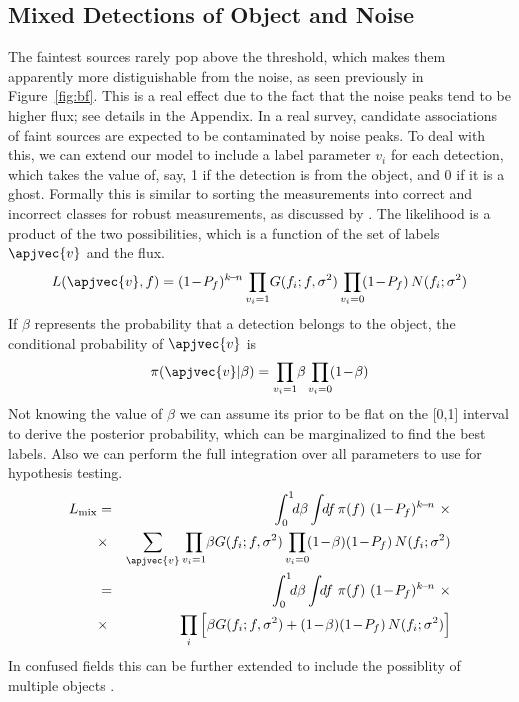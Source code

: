 \iffalse
\subsection{Mixed Detections of Object and Noise}
\label{sec:mix}
\noindent
The faintest sources rarely pop above the threshold, which makes them apparently more distiguishable from the noise, as seen previously in Figure~\ref{fig:bf}. This is a real effect due to the fact that the noise peaks tend to be higher flux; see details in the Appendix. In a real survey, candidate associations of faint sources are expected to be contaminated  by noise peaks. To deal with this, we can  extend our model to include a label parameter $v_i$ for each detection, which takes the value of, say, 1 if the detection is from the object, and 0 if it is a ghost.
%
Formally this is similar to sorting the measurements into correct and incorrect classes for robust measurements, as discussed by \citet{press}.
%
The likelihood is a product of the two possibilities, which is a function of the set of labels $\apjvec{v}$ and the flux.
%
\begin{equation}
L(\apjvec{v},f)= (1\!-\!P_f)^{k\!-\!n} \prod_{v_i=1}\!G(f_i;f,\sigma^2) \prod_{v_i=0}\!(1\!-\!P_f)\,N(f_i;\sigma^2)
\end{equation}
%
If $\beta$ represents the probability that a detection belongs to the object, the conditional probability of $\apjvec{v}$ is
%
\begin{equation}
\pi(\apjvec{v}|\beta) = \prod_{v_i=1}\!\beta \prod_{v_i=0}\!(1\!-\!\beta)
\end{equation}
%
Not knowing the value of $\beta$ we can assume its prior to be flat on the [0,1] interval to derive the posterior probability, which can be marginalized to find the best labels. Also we can perform the full integration over all parameters to use for hypothesis testing.
%
\begin{eqnarray}
L_{\text{mix}} & = & \int_0^1\!\!d\beta \int\!\!df\,\pi(f)\ (1\!-\!P_f)^{k\!-\!n} \ \times\\
 & \times & \sum_{\apjvec{v}}\prod_{v_i=1}\!\beta G(f_i;f,\sigma^2) \prod_{v_i=0}\!(1\!-\!\beta)(1\!-\!P_f)\,N(f_i;\sigma^2) \nonumber \\
 & = & \int_0^1\!\!d\beta \int\!\!df\ \pi(f)\ (1\!-\!P_f)^{k\!-\!n}  \ \times \\
 & \times & \prod_i \Big[\beta G(f_i;f,\sigma^2) + (1\!-\!\beta)(1\!-\!P_f)\,N(f_i;\sigma^2) \Big] \nonumber
\end{eqnarray}
%
In confused fields this can be further extended to include the possiblity of multiple objects \citep{loredo}.



